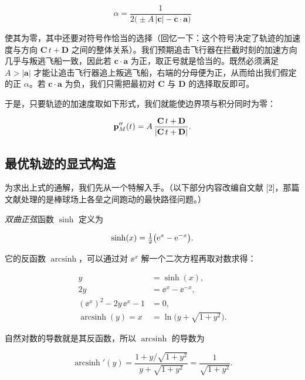 \begin{equation}
\alpha=\frac{1}{2\bigl(\pm A\,|\mathbf{c}|-\mathbf{c}\cdot\mathbf{a}\bigr)}
\end{equation}

使其为零，其中还要对符号作恰当的选择（回忆一下：这个符号决定了轨迹的加速度与方向 $\mathbf{C}\,t+\mathbf{D}$ 之间的整体关系）。我们预期追击飞行器在拦截时刻的加速方向几乎与叛逃飞船一致，因此若 $\mathbf{c}\cdot\mathbf{a}$ 为正，取正号就是恰当的。既然必须满足 $A>|\mathbf{a}|$ 才能让追击飞行器追上叛逃飞船，右端的分母便为正，从而给出我们假定的正 $\alpha$。若 $\mathbf{c}\cdot\mathbf{a}$ 为负，我们只需把最初对 $\mathbf{C}$ 与 $\mathbf{D}$ 的选择取反即可。

于是，只要轨迹的加速度取如下形式，我们就能使边界项与积分同时为零：

\begin{equation}
\mathbf{p}_M''(t)=A\,\frac{\mathbf{C}\,t+\mathbf{D}}{|\mathbf{C}\,t+\mathbf{D}|}.
\end{equation}

\subsection{最优轨迹的显式构造}

为求出上式的通解，我们先从一个特解入手。（以下部分内容改编自文献 [2]，那篇文献处理的是棒球场上各垒之间跑动的最快路径问题。）

\emph{双曲正弦}函数 $\sinh$ 定义为

\begin{equation}
\sinh(x)=\tfrac{1}{2}\bigl(\mathrm{e}^{x}-\mathrm{e}^{-x}\bigr).
\end{equation}

它的反函数 $\operatorname{arcsinh}$，可以通过对 $\ee^{x}$ 解一个二次方程再取对数求得：

\begin{align}
y &= \sinh(x), \\
2y &= \ee^{x}-\ee^{-x}, \\
(\ee^{x})^{2}-2y\,\ee^{x}-1 &= 0, \\
\operatorname{arcsinh}(y) = x &= \ln\bigl(y+\sqrt{1+y^{2}}\bigr).
\end{align}

自然对数的导数就是其反函数，所以 $\operatorname{arcsinh}$ 的导数为

\begin{equation}
\operatorname{arcsinh}'(y)=\frac{1+y/\sqrt{1+y^{2}}}{y+\sqrt{1+y^{2}}}=\frac{1}{\sqrt{1+y^{2}}} .
\end{equation}

